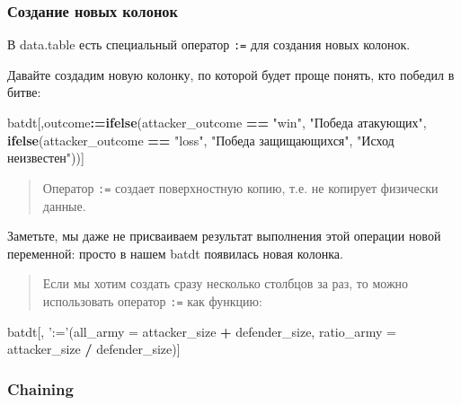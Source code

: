 \documentclass[]{book}
\newenvironment{Shaded}{\begin{snugshade}}{\end{snugshade}}
\newcommand{\KeywordTok}[1]{\textcolor[rgb]{0.13,0.29,0.53}{\textbf{#1}}}
\newcommand{\DataTypeTok}[1]{\textcolor[rgb]{0.13,0.29,0.53}{#1}}
\newcommand{\StringTok}[1]{\textcolor[rgb]{0.31,0.60,0.02}{#1}}
\newcommand{\OperatorTok}[1]{\textcolor[rgb]{0.81,0.36,0.00}{\textbf{#1}}}
\newcommand{\ErrorTok}[1]{\textcolor[rgb]{0.64,0.00,0.00}{\textbf{#1}}}
\newcommand{\NormalTok}[1]{#1}
\begin{document}
\subsubsection{Создание новых колонок}\label{new_col_dt}

В data.table есть специальный оператор \texttt{:=} для создания новых
колонок.

Давайте создадим новую колонку, по которой будет проще понять, кто
победил в битве:

\begin{Shaded}
\begin{Highlighting}[]
\NormalTok{batdt[,outcome}\OperatorTok{:}\ErrorTok{=}\KeywordTok{ifelse}\NormalTok{(attacker_outcome }\OperatorTok{==}\StringTok{ "win"}\NormalTok{, }
                       \StringTok{"Победа атакующих"}\NormalTok{, }
                       \KeywordTok{ifelse}\NormalTok{(attacker_outcome }\OperatorTok{==}\StringTok{ "loss"}\NormalTok{, }
                              \StringTok{"Победа защищающихся"}\NormalTok{, }
                              \StringTok{"Исход неизвестен"}\NormalTok{))]}
\end{Highlighting}
\end{Shaded}

\begin{quote}
Оператор \texttt{:=} создает поверхностную копию, т.е. не копирует
физически данные.
\end{quote}

Заметьте, мы даже не присваиваем результат выполнения этой операции
новой переменной: просто в нашем batdt появилась новая колонка.

\begin{quote}
Если мы хотим создать сразу несколько столбцов за раз, то можно
использовать оператор \texttt{:=} как функцию:
\end{quote}

\begin{Shaded}
\begin{Highlighting}[]
\NormalTok{batdt[, }\StringTok{':='}\NormalTok{(}\DataTypeTok{all_army =}\NormalTok{ attacker_size }\OperatorTok{+}\StringTok{ }\NormalTok{defender_size, }
             \DataTypeTok{ratio_army =}\NormalTok{ attacker_size }\OperatorTok{/}\StringTok{ }\NormalTok{defender_size)]}
\end{Highlighting}
\end{Shaded}

\subsubsection{Chaining}\label{chaining}
\end{document}
